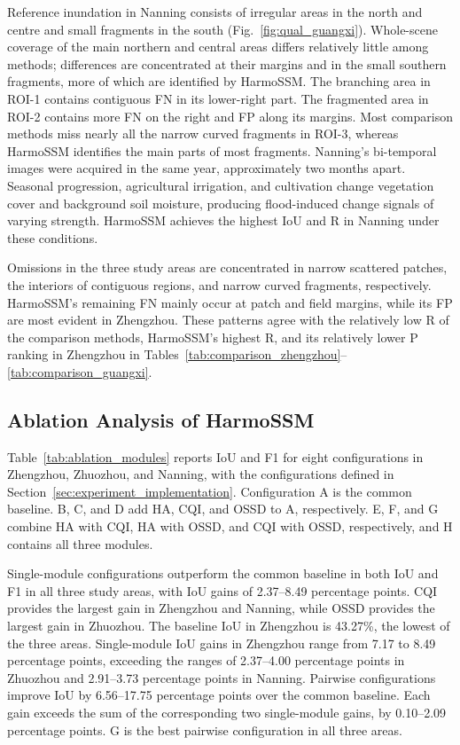 \documentclass[authoryear,preprint,12pt]{elsarticle}
\newcommand{\floatingtableinput}[1]{%
  \begingroup
  \let\originaltable\table
  \renewcommand{\table}[1][]{\originaltable[!htb]}%
  \endgroup
}
\begin{document}
Reference inundation in Nanning consists of irregular areas in the north and centre and small fragments in the south (Fig.~\ref{fig:qual_guangxi}). Whole-scene coverage of the main northern and central areas differs relatively little among methods; differences are concentrated at their margins and in the small southern fragments, more of which are identified by HarmoSSM. The branching area in ROI-1 contains contiguous FN in its lower-right part. The fragmented area in ROI-2 contains more FN on the right and FP along its margins. Most comparison methods miss nearly all the narrow curved fragments in ROI-3, whereas HarmoSSM identifies the main parts of most fragments. Nanning's bi-temporal images were acquired in the same year, approximately two months apart. Seasonal progression, agricultural irrigation, and cultivation change vegetation cover and background soil moisture, producing flood-induced change signals of varying strength. HarmoSSM achieves the highest IoU and R in Nanning under these conditions.

Omissions in the three study areas are concentrated in narrow scattered patches, the interiors of contiguous regions, and narrow curved fragments, respectively. HarmoSSM's remaining FN mainly occur at patch and field margins, while its FP are most evident in Zhengzhou. These patterns agree with the relatively low R of the comparison methods, HarmoSSM's highest R, and its relatively lower P ranking in Zhengzhou in Tables~\ref{tab:comparison_zhengzhou}--\ref{tab:comparison_guangxi}.

\subsection{Ablation Analysis of HarmoSSM}\label{sec:ablation}

Table~\ref{tab:ablation_modules} reports IoU and F1 for eight configurations in Zhengzhou, Zhuozhou, and Nanning, with the configurations defined in Section~\ref{sec:experiment_implementation}. Configuration A is the common baseline. B, C, and D add HA, CQI, and OSSD to A, respectively. E, F, and G combine HA with CQI, HA with OSSD, and CQI with OSSD, respectively, and H contains all three modules.

\floatingtableinput{tables/table7_ablation_harmossm.tex}

Single-module configurations outperform the common baseline in both IoU and F1 in all three study areas, with IoU gains of 2.37--8.49 percentage points. CQI provides the largest gain in Zhengzhou and Nanning, while OSSD provides the largest gain in Zhuozhou. The baseline IoU in Zhengzhou is 43.27\%, the lowest of the three areas. Single-module IoU gains in Zhengzhou range from 7.17 to 8.49 percentage points, exceeding the ranges of 2.37--4.00 percentage points in Zhuozhou and 2.91--3.73 percentage points in Nanning. Pairwise configurations improve IoU by 6.56--17.75 percentage points over the common baseline. Each gain exceeds the sum of the corresponding two single-module gains, by 0.10--2.09 percentage points. G is the best pairwise configuration in all three areas.
\end{document}
